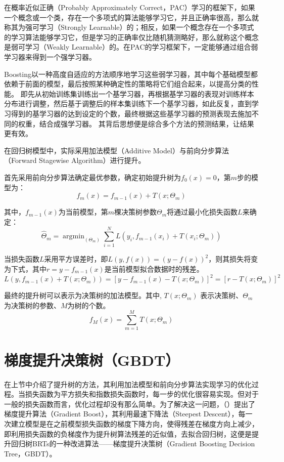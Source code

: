 在概率近似正确（Probably Approximately Correct，PAC）学习的框架下，如果一个概念或一个类，存在一个多项式的算法能够学习它，并且正确率很高，那么就称其为强可学习（Strongly Learnable）的；相反，如果一个概念存在一个多项式的学习算法能够学习它，但是学习的正确率仅比随机猜测略好，那么就称这个概念是弱可学习（Weakly Learnable）的\cite{microstrongShenRuLiJieTiShengShuBoostingTree2019}。在PAC的学习框架下，一定能够通过组合弱学习器来得到一个强学习器。

Boosting以一种高度自适应的方法顺序地学习这些弱学习器，其中每个基础模型都依赖于前面的模型，最后按照某种确定性的策略将它们组合起来，以提高分类的性能。
即先从初始训练集训练出一个基学习器，再根据基学习器的表现对训练样本分布进行调整，然后基于调整后的样本集训练下一个基学习器，如此反复，直到学习得到的基学习器的达到设定的个数，最终根据这些基学习器的预测表现去施加不同的权重，结合成强学习器\cite{JiQiXueXiBiJiGBDTYuanLiGradientBoosting}。
其背后思想便是综合多个方法的预测结果，让结果更有效。

在回归树模型中，实际采用加法模型（Additive Model）与前向分步算法（Forward Stagewise Algorithm）进行提升。

首先采用前向分步算法确定最优参数，确定初始提升树为$f_{0}(x)=0$，第$m$步的模型为：
$$
f_{m}(x)=f_{m-1}(x)+T\left(x;\Theta_{m}\right)
$$

其中，$f_{m-1}(x)$为当前模型，第$m$棵决策树参数$\Theta_{m}$将通过最小化损失函数$L$来确定：
$$
\hat{\Theta}_{m}=\operatorname{argmin}_{\left(\Theta_{m}\right)} \sum_{i=1}^{N} L\left(y_{i}, f_{m-1}\left(x_{i}\right)+T\left(x_{i} ; \Theta_{m}\right)\right)
$$

当损失函数$L$采用平方误差时，即$L(y, f(x))=(y-f(x))^{2}$，则其损失将变为下式，其中$r=y-f_{m-1}(x)$是当前模型拟合数据时的残差。
$$
L\left(y, f_{m-1}(x)+T\left(x ; \Theta_{m}\right)\right)=\left[y-f_{m-1}(x)-T\left(x ; \Theta_{m}\right)\right]^{2}=\left[r-T\left(x ; \Theta_{m}\right)\right]^{2}
$$

最终的提升树可以表示为决策树的加法模型。其中, $T\left(x ; \Theta_{m}\right)$ 表示决策树、$\Theta_{m}$为决策树的参数、$M$为树的个数。
$$
f_{M}(x)=\sum_{m=1}^{M} T\left(x ; \Theta_{m}\right)
$$


\section{梯度提升决策树（GBDT）}
在上节中介绍了提升树的方法，其利用加法模型和前向分步算法实现学习的优化过程。当损失函数为平方损失和指数损失函数时，每一步的优化很容易实现。但对于一般的损失函数而言，优化过程却没有那么简单。为了解决这一问题，\citeauthor{friedmanGreedyFunctionApproximation2001}（\citeyear{friedmanGreedyFunctionApproximation2001}）提出了梯度提升算法（Gradient Boost），其利用最速下降法（Steepest Descent），每一次建立模型是在之前模型损失函数的梯度下降方向，使得残差在梯度方向上减少，即利用损失函数的负梯度作为提升树算法残差的近似值，去拟合回归树，这便是提升回归树BRTs的一种改进算法——梯度提升决策树（Gradient Boosting Decision Tree，GBDT）\cite{GBDTTiDuTiShengJueCeShuJianShu,JiQiXueXiBiJiGBDTYuanLiGradientBoosting}。


